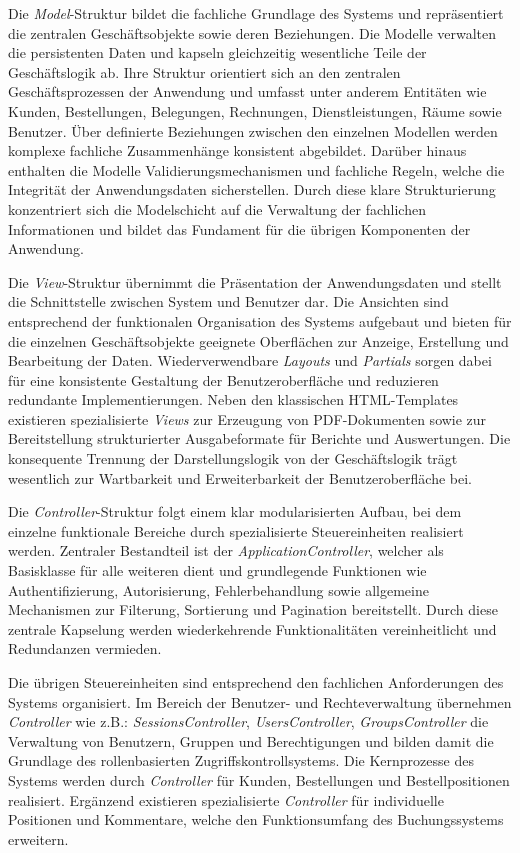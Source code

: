 Die \textit{Model}-Struktur bildet die fachliche Grundlage des Systems und repräsentiert die zentralen Geschäftsobjekte sowie deren Beziehungen. Die Modelle verwalten die persistenten Daten und kapseln gleichzeitig wesentliche Teile der Geschäftslogik ab. Ihre Struktur orientiert sich an den zentralen Geschäftsprozessen der Anwendung und umfasst unter anderem Entitäten wie Kunden, Bestellungen, Belegungen, Rechnungen, Dienstleistungen, Räume sowie Benutzer. Über definierte Beziehungen zwischen den einzelnen Modellen werden komplexe fachliche Zusammenhänge konsistent abgebildet. Darüber hinaus enthalten die Modelle Validierungsmechanismen und fachliche Regeln, welche die Integrität der Anwendungsdaten sicherstellen. Durch diese klare Strukturierung\- 
konzentriert sich die Modelschicht auf die Verwaltung der fachlichen Informationen und bildet das Fundament für die übrigen Komponenten der Anwendung.

Die \textit{View}-Struktur übernimmt die Präsentation der Anwendungsdaten und stellt die Schnittstelle zwischen System und Benutzer dar. Die Ansichten sind entsprechend der funktionalen Organisation des Systems aufgebaut und bieten für die einzelnen Geschäftsobjekte geeignete Oberflächen zur Anzeige, Erstellung und Bearbeitung der Daten. Wiederverwendbare \textit{Layouts} und \textit{Partials} sorgen dabei für eine konsistente Gestaltung der Benutzeroberfläche und reduzieren redundante Implementierungen. Neben den klassischen HTML-Templates existieren spezialisierte \textit{Views} zur Erzeugung von PDF-Dokumenten sowie zur Bereitstellung strukturierter Ausgabeformate für Berichte und Auswertungen. Die konsequente Trennung der Darstellungslogik von der Geschäftslogik trägt wesentlich zur Wartbarkeit und Erweiterbarkeit der Benutzeroberfläche bei.

Die \textit{Controller}-Struktur folgt einem klar modularisierten Aufbau, bei dem einzelne funktionale Bereiche durch spezialisierte Steuereinheiten realisiert werden. Zentraler Bestandteil ist der \textit{ApplicationController}, welcher als Basisklasse für alle weiteren dient und grundlegende Funktionen wie Authentifizierung, Autorisierung, Fehlerbehandlung sowie allgemeine Mechanismen zur Filterung, Sortierung und Pagination bereitstellt. Durch diese zentrale Kapselung werden wiederkehrende Funktionalitäten vereinheitlicht und Redundanzen vermieden.

Die übrigen Steuereinheiten sind entsprechend den fachlichen Anforderungen des Systems organisiert. Im Bereich der Benutzer- und Rechteverwaltung übernehmen \textit{Controller} wie z.B.: \textit{SessionsController}, \textit{UsersController}, \textit{GroupsController} die Verwaltung von Benutzern, Gruppen und Berechtigungen und bilden damit die Grundlage des rollenbasierten Zugriffskontrollsystems. Die Kernprozesse des Systems werden durch \textit{Controller} für Kunden, Bestellungen und Bestellpositionen realisiert. Ergänzend existieren spezialisierte \textit{Controller} für individuelle Positionen und Kommentare, welche den Funktionsumfang des Buchungssystems erweitern.

